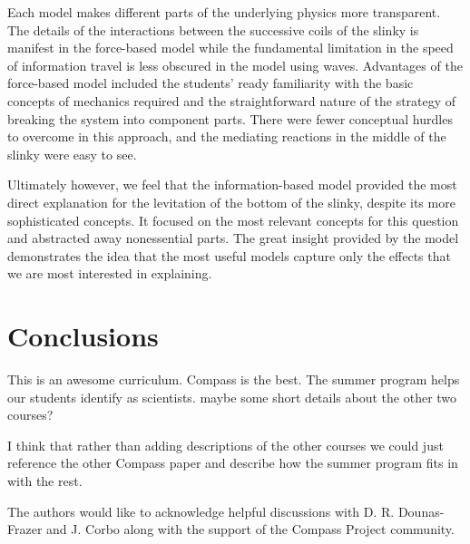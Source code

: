\documentclass[aps,pre,10pt,superscriptaddress,showpacs,amsmath,amssymb,nofootinbib]{revtex4-1}
\begin{document}
Each model makes different parts of the underlying physics
more transparent. The details of the interactions between the successive coils
of the slinky is manifest in the force-based model while the fundamental
limitation in the speed of information travel is less obscured in the model
using waves. Advantages of the force-based model included the students' ready
familiarity with the basic concepts of mechanics required and the straightforward
nature of the strategy of breaking the system into component parts. There were
fewer conceptual hurdles to overcome in this approach, and the mediating
reactions in the middle of the slinky were easy to see. 

Ultimately however, we feel that the information-based model provided the
most direct explanation for the levitation of the bottom of the slinky, despite
its more sophisticated concepts. It focused
on the most relevant concepts for this question and abstracted away
nonessential parts. The great insight provided by the
model demonstrates the idea that the most useful models
capture only the effects that we are most interested in explaining.

\section{Conclusions}
This is an awesome curriculum.  Compass is the best.  The summer program helps
our students identify as scientists.  maybe some short details about the other
two courses?

I think that rather than adding descriptions of the other courses we could just
reference the other Compass paper and describe how the summer program fits in 
with the rest.


\acknowledgments The authors would like to acknowledge helpful discussions with
D. R. Dounas-Frazer and J. Corbo along with the support of the Compass Project
community.


\end{document}
